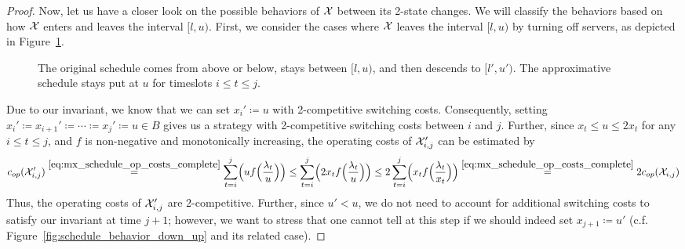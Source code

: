 \begin{proof}
Now, let us have a closer look on the possible behaviors of $\mathcal{X}$ between its 2-state changes. We will classify the behaviors based on how $\mathcal{X}$ enters and leaves the interval $[l,u)$. First, we consider the cases where $\mathcal{X}$ leaves the interval $[l,u)$ by turning off servers, as depicted in Figure~\ref{fig:schedule_behavior_down}.
\begin{figure}[H]
\captionsetup[subfigure]{labelformat=empty}
\begin{subfigure}[b]{0.49\textwidth}

\end{subfigure}
\hfill
\begin{subfigure}[b]{0.49\textwidth}

\end{subfigure}
\caption{The original schedule comes from above or below, stays between $[l,u)$, and then descends to $[l',u')$. The approximative schedule stays put at $u$ for timeslots $i\le t\le j$.}
\label{fig:schedule_behavior_down}
\end{figure}
Due to our invariant, we know that we can set $x_i'\coloneqq u$ with 2-competitive switching costs. Consequently, setting $x_i'\coloneqq x_{i+1}'\coloneqq\dotsb\coloneqq x_j'\coloneqq u\in B$ gives us a strategy with 2-competitive switching costs between $i$ and $j$. Further, since $x_t\le u\le2x_t$ for any $i\le t\le j$, and $f$ is non-negative and monotonically increasing, the operating costs of $\mathcal{X}'_{i,j}$ can be estimated by
\begin{equation*}
	c_{op}(\mathcal{X}_{i,j}')\stackrel{\eqref{eq:mx_schedule_op_costs_complete}}{=}\sum\limits_{t=i}^j\Bigl(uf\Bigl(\frac{\lambda_t}{u}\Bigr)\Bigr)\le\sum\limits_{t=i}^j\Bigl(2x_tf\Bigl(\frac{\lambda_t}{u}\Bigr)\Bigr)\le2\sum\limits_{t=i}^j\Bigl(x_tf\Bigl(\frac{\lambda_t}{x_t}\Bigr)\Bigr)\stackrel{\eqref{eq:mx_schedule_op_costs_complete}}{=}2c_{op}(\mathcal{X}_{i,j})
\end{equation*}
Thus, the operating costs of $\mathcal{X}_{i,j}'$ are 2-competitive. Further, since $u'<u$, we do not need to account for additional switching costs to satisfy our invariant at time $j+1$; however, we want to stress that one cannot tell at this step if we should indeed set $x_{j+1}\coloneqq u'$ (c.f. Figure~\ref{fig:schedule_behavior_down_up} and its related case). 
	

\end{proof}
